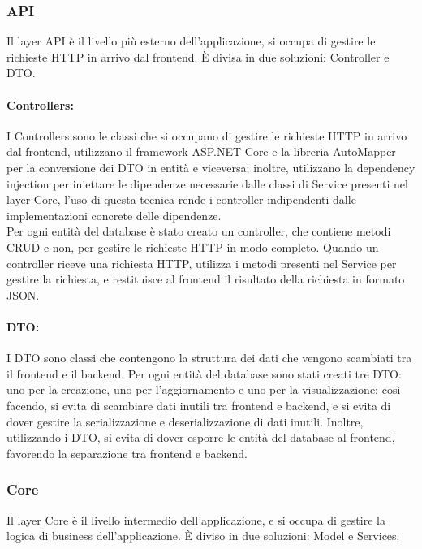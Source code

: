 \subsubsection{API}
Il layer API è il livello più esterno dell'applicazione, si occupa di gestire le richieste HTTP in arrivo dal frontend. È divisa in due soluzioni: Controller e DTO.\\
\paragraph{Controllers:}
I Controllers sono le classi che si occupano di gestire le richieste HTTP in arrivo dal frontend, utilizzano il framework ASP.NET Core e la libreria AutoMapper per la conversione dei DTO in entità e viceversa; inoltre, utilizzano la dependency injection per iniettare le dipendenze necessarie dalle classi di Service presenti nel layer Core, l'uso di questa tecnica rende i controller indipendenti dalle implementazioni concrete delle dipendenze.\\
Per ogni entità del database è stato creato un controller, che contiene metodi CRUD e non, per gestire le richieste HTTP in modo completo. Quando un controller riceve una richiesta HTTP, utilizza i metodi presenti nel Service per gestire la richiesta, e restituisce al frontend il risultato della richiesta in formato JSON.\\

\paragraph{DTO:}
I DTO sono classi che contengono la struttura dei dati che vengono scambiati tra il frontend e il backend.
Per ogni entità del database sono stati creati tre DTO: uno per la creazione, uno per l'aggiornamento e uno per la visualizzazione; così facendo, si evita di scambiare dati inutili tra frontend e backend, e si evita di dover gestire la serializzazione e deserializzazione di dati inutili. Inoltre, utilizzando i DTO, si evita di dover esporre le entità del database al frontend, favorendo la separazione tra frontend e backend.\\

\subsubsection{Core}
Il layer Core è il livello intermedio dell'applicazione, e si occupa di gestire la logica di business dell'applicazione. È diviso in due soluzioni: Model e Services.\\

